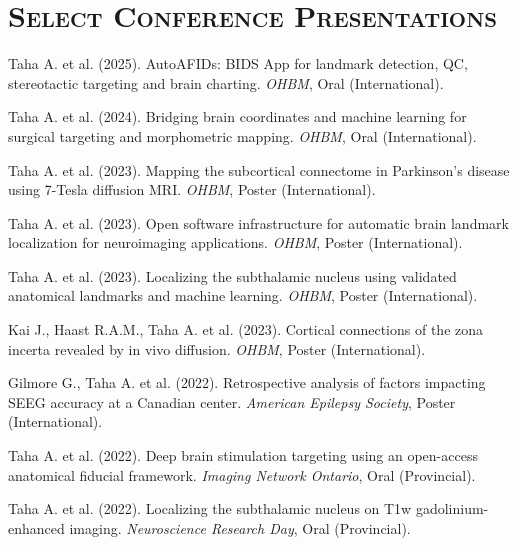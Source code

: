 \section*{\textsc{Select Conference Presentations}} \noindent\hrulefill \vspace{0.5em}
    \item Taha A. et al. (2025). AutoAFIDs: BIDS App for landmark detection, QC, stereotactic targeting and brain charting. \textit{OHBM}, Oral (International).
    \item Taha A. et al. (2024). Bridging brain coordinates and machine learning for surgical targeting and morphometric mapping. \textit{OHBM}, Oral (International).
    \item Taha A. et al. (2023). Mapping the subcortical connectome in Parkinson’s disease using 7-Tesla diffusion MRI. \textit{OHBM}, Poster (International).
    \item Taha A. et al. (2023). Open software infrastructure for automatic brain landmark localization for neuroimaging applications. \textit{OHBM}, Poster (International).
    \item Taha A. et al. (2023). Localizing the subthalamic nucleus using validated anatomical landmarks and machine learning. \textit{OHBM}, Poster (International).
    \item Kai J., Haast R.A.M., Taha A. et al. (2023). Cortical connections of the zona incerta revealed by in vivo diffusion. \textit{OHBM}, Poster (International).
    \item Gilmore G., Taha A. et al. (2022). Retrospective analysis of factors impacting SEEG accuracy at a Canadian center. \textit{American Epilepsy Society}, Poster (International).
    \item Taha A. et al. (2022). Deep brain stimulation targeting using an open-access anatomical fiducial framework. \textit{Imaging Network Ontario}, Oral (Provincial).
    \item Taha A. et al. (2022). Localizing the subthalamic nucleus on T1w gadolinium-enhanced imaging. \textit{Neuroscience Research Day}, Oral (Provincial).
